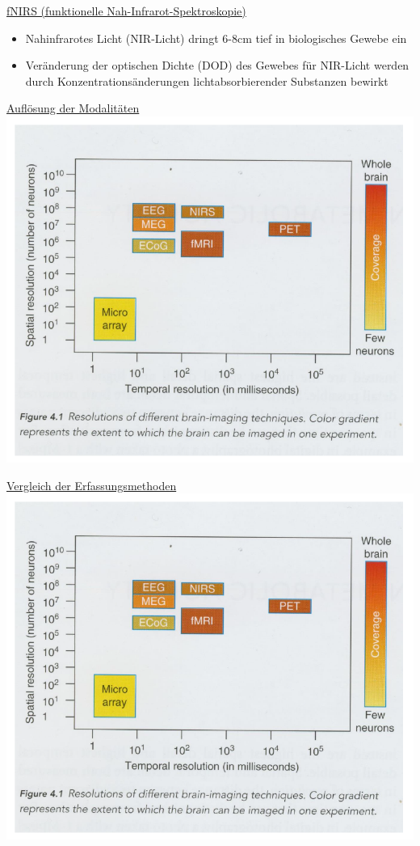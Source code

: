 \documentclass[a4paper,10pt,oneside]{article}
\begin{document}
\underline{fNIRS (funktionelle Nah-Infrarot-Spektroskopie)} \\
	\begin{itemize}
		\item Nahinfrarotes Licht (NIR-Licht) dringt 6-8cm tief in biologisches Gewebe ein
		\item Veränderung der optischen Dichte (DOD) des Gewebes für NIR-Licht werden durch Konzentrationsänderungen lichtabsorbierender Substanzen bewirkt 
	\end{itemize}

\underline{Auflösung der Modalitäten} \\
\includegraphics[scale=0.3]{Grafiken/1813.png}

\underline{Vergleich der Erfassungsmethoden} \\
\includegraphics[scale=0.3]{Grafiken/1813.png}
\end{document}
